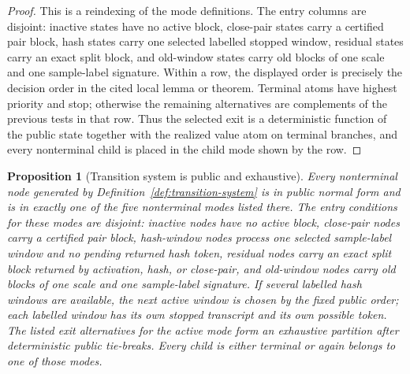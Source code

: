 \documentclass[11pt]{article}
\newtheorem{proposition}[theorem]{Proposition}
\begin{document}
\begin{proof}
This is a reindexing of the mode definitions.  The entry columns are disjoint:
inactive states have no active block, close-pair states carry a certified pair
block, hash states carry one selected labelled stopped window, residual states
carry an exact split block, and old-window states carry old blocks of one scale
and one sample-label signature.  Within a row, the displayed order is precisely
the decision order in the cited local lemma or theorem.  Terminal atoms have
highest priority and stop; otherwise the remaining alternatives are complements
of the previous tests in that row.  Thus the selected exit is a deterministic
function of the public state together with the realized value atom on terminal
branches, and every nonterminal child is placed in the child mode shown by the
row.
\end{proof}

\begin{proposition}[Transition system is public and exhaustive]
\label{prop:transition-system}
Every nonterminal node generated by Definition~\ref{def:transition-system}
is in public normal form and is in exactly one of the five nonterminal modes
listed there.  The entry conditions for these modes are disjoint:
inactive nodes have no active block, close-pair nodes carry a certified pair
block, hash-window nodes process one selected sample-label window and no pending
returned hash token, residual nodes carry an exact split block returned by
activation, hash, or close-pair, and old-window nodes carry old blocks of one
scale and one sample-label signature.  If several labelled hash windows are
available, the next active window is chosen by the fixed public order; each
labelled window has its own stopped transcript and its own possible token.  The
listed exit alternatives for the active mode form an exhaustive partition after
deterministic public tie-breaks.  Every child is either terminal or again
belongs to one of those modes.
\end{proposition}
\end{document}
